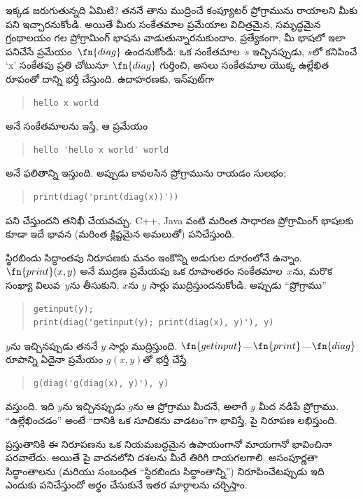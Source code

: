 \documentclass[../../../include/open-logic-section]{subfiles}
\begin{document}
\begin{explain}
ఇక్కడ జరుగుతున్నది ఏమిటి? తననే తాను ముద్రించే కంప్యూటర్ ప్రోగ్రామును
రాయాలని మీకు పని ఇచ్చారనుకోండి. అయితే మీరు సంకేతమాల ప్రమేయాల విచిత్రమైన,
సమృద్ధమైన గ్రంథాలయం గల ప్రోగ్రామింగ్ భాషను వాడుతున్నారనుకుందాం.
ప్రత్యేకంగా, మీ భాషలో ఇలా పనిచేసే ప్రమేయం~$\fn{diag}$ ఉందనుకోండి:
ఒక సంకేతమాల~$s$ ఇచ్చినప్పుడు, $s$లో కనిపించే `x' సంకేతపు ప్రతి
చోటునూ $\fn{diag}$ గుర్తించి, అసలు సంకేతమాల యొక్క ఉల్లేఖిత రూపంతో
దాన్ని భర్తీ చేస్తుంది. ఉదాహరణకు, ఇన్‌పుట్‌గా
\begin{quote}
\begin{verbatim}
hello x world
\end{verbatim}
\end{quote}
అనే సంకేతమాలను ఇస్తే, ఆ ప్రమేయం
\begin{quote}
\begin{verbatim}
hello 'hello x world' world
\end{verbatim}
\end{quote}
అనే ఫలితాన్ని ఇస్తుంది. అప్పుడు కావలసిన ప్రోగ్రామును రాయడం సులభం;
\begin{quote}
\begin{verbatim}
print(diag('print(diag(x))'))
\end{verbatim}
\end{quote}
పని చేస్తుందని తనిఖీ చేయవచ్చు. C++, Java వంటి మరింత సాధారణ
ప్రోగ్రామింగ్ భాషలకు కూడా ఇదే భావన (మరింత క్లిష్టమైన అమలుతో) పనిచేస్తుంది.

స్థిరబిందు సిద్ధాంతపు నిరూపణకు మనం ఇంకొన్ని అడుగుల దూరంలోనే ఉన్నాం.
$\fn{print}(x,y)$ అనే ముద్రణ ప్రమేయపు ఒక రూపాంతరం సంకేతమాల~$x$ను,
మరొక సంఖ్యా విలువ~$y$ను తీసుకుని, $x$ను $y$ సార్లు
ముద్రిస్తుందనుకోండి. అప్పుడు ``ప్రోగ్రాము''
\begin{quote}
\begin{verbatim}
getinput(y);
print(diag('getinput(y); print(diag(x), y)'), y)
\end{verbatim}
\end{quote}
$y$ను ఇచ్చినప్పుడు తననే $y$ సార్లు ముద్రిస్తుంది.
$\fn{getinput}$---$\fn{print}$---$\fn{diag}$ రూపాన్ని ఏదైనా
ప్రమేయం $g(x,y)$తో భర్తీ చేస్తే
\begin{quote}
\begin{verbatim}
g(diag('g(diag(x), y)'), y)
\end{verbatim}
\end{quote}
వస్తుంది. ఇది $y$ను ఇచ్చినప్పుడు $g$ను ఆ ప్రోగ్రాము మీదనే, అలాగే $y$ మీద
నడిపే ప్రోగ్రాము. ``ఉల్లేఖించడం'' అంటే ``దానికి ఒక సూచికను వాడటం''గా
భావిస్తే, పై నిరూపణ లభిస్తుంది.

ప్రస్తుతానికి ఈ నిరూపణను ఒక నియమబద్ధమైన ఉపాయంగానో మాయగానో
భావించినా పరవాలేదు. అయితే పై వాదనలోని దశలను మీరే తిరిగి రాయగలగాలి. అసంపూర్ణతా సిద్ధాంతాలను (మరియు సంబంధిత ``స్థిరబిందు
సిద్ధాంతాన్ని'') నిరూపించేటప్పుడు ఇది ఎందుకు పనిచేస్తుందో అర్థం చేసుకునే
ఇతర మార్గాలను చర్చిస్తాం.
\end{explain}
\end{document}
